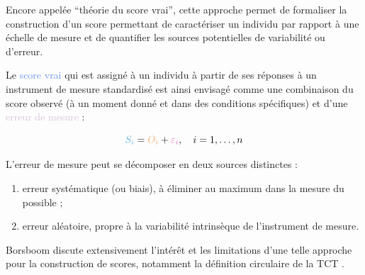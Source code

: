 

Encore appelée \enquote{théorie du score vrai}, cette approche permet de
formaliser la construction d'un score permettant de caractériser un individu par
rapport à une échelle de mesure et de quantifier les sources potentielles de
variabilité ou d'erreur.

Le \textcolor{CornflowerBlue}{score vrai} qui est assigné à un individu à partir
de ses réponses à un instrument de mesure standardisé est ainsi envisagé comme
une combinaison du \textcolor{Apricot}{score observé} (à un moment donné et dans
des conditions spécifiques) et d'une \textcolor{Thistle}{erreur de mesure} :

\[
\textcolor{CornflowerBlue}{S_i} = \textcolor{Apricot}{O_i} + \textcolor{Thistle}{\varepsilon_i},\quad i=1,\dots,n
\]





L'erreur de mesure peut se décomposer en deux sources distinctes :
\begin{enumerate}
\item erreur systématique (ou biais), à éliminer au maximum dans la mesure du
  possible ; 
\item erreur aléatoire, propre à la variabilité intrinsèque de l'instrument de
  mesure. 
\end{enumerate}

Borsboom discute extensivement l'intérêt et les limitations d'une telle approche
pour la construction de scores, notamment la définition circulaire de la TCT \autocite{Borsboom2006,Borsboom2005}.




